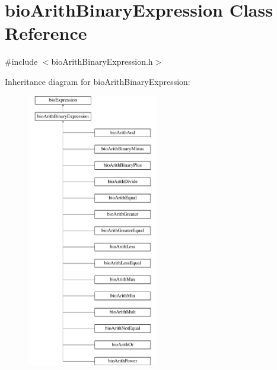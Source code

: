 \hypertarget{classbio_arith_binary_expression}{}\section{bio\+Arith\+Binary\+Expression Class Reference}
\label{classbio_arith_binary_expression}


{\ttfamily \#include $<$bio\+Arith\+Binary\+Expression.\+h$>$}

Inheritance diagram for bio\+Arith\+Binary\+Expression\+:\begin{figure}[H]
\begin{center}
\leavevmode
\includegraphics[height=12.000000cm]{classbio_arith_binary_expression}
\end{center}
\end{figure}
